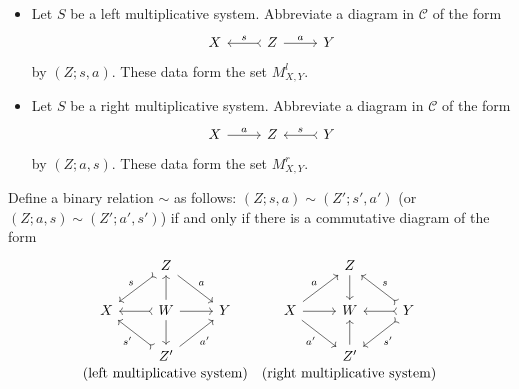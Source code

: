 \begin{itemize}
	\item Let $S$ be a left multiplicative system. Abbreviate a diagram in
	$\mathcal{C}$ of the form
	\[\begin{tikzcd} X & Z \arrow[rightarrowtail, l, "s"'] \arrow[r, "a"] & Y \end{tikzcd}\]
	by $(Z;s,a)$. These data form the set $M_{X,Y}^l$.
	\item Let $S$ be a right multiplicative system. Abbreviate a diagram in
	$\mathcal{C}$ of the form
	\[\begin{tikzcd} X \arrow[r, "a"] & Z & Y \arrow[rightarrowtail, l, "s"'] \end{tikzcd}\]
	by $(Z;a,s)$. These data form the set $M_{X,Y}^r$.
\end{itemize}

Define a binary relation $\sim$ as follows:
$(Z;s,a)\sim(Z';s',a')$ (or $(Z;a,s)\sim(Z';a',s')$) if and only if there
is a commutative diagram of the form
\begin{equation}\label{eqn:localization-sim}
	\begin{array}{cc}
		\begin{tikzcd}
			& Z \arrow[rightarrowtail, ld, "s"'] \arrow[rd, "a"] & \\
			X & W \arrow[rightarrowtail, l] \arrow[r] \arrow[u] \arrow[d] & Y \\
			& Z' \arrow[rightarrowtail, lu, "{s'}"] \arrow[ru, "{a'}"'] &
		\end{tikzcd} &
		\begin{tikzcd}
			& Z \arrow[d] & \\
			X \arrow[r] \arrow[ru, "a"] \arrow[rd, "{a'}"'] & W & Y \arrow[rightarrowtail, l] \arrow[rightarrowtail, lu, "s"'] \arrow[rightarrowtail, ld, "{s'}"] \\
			& Z' \arrow[u] &
		\end{tikzcd} \\
		\text{(left multiplicative system)} & \text{(right multiplicative system)}
	\end{array}
\end{equation}

